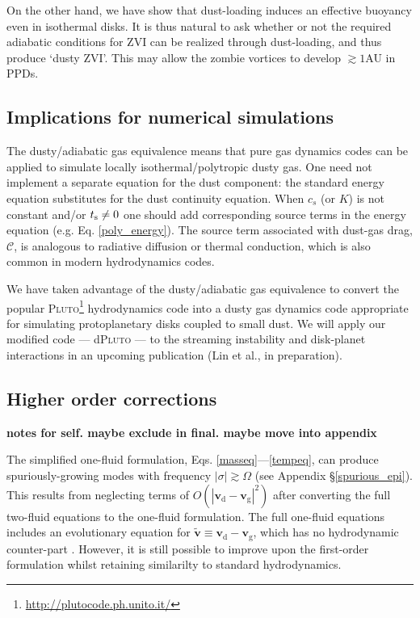 On the other hand, we have show that dust-loading induces an effective
buoyancy even in isothermal disks. It is thus natural to ask whether or not
the required adiabatic conditions for ZVI can be realized through
dust-loading, and thus produce `dusty ZVI'. This may allow the zombie
vortices to develop $\gtrsim 1$AU in PPDs. 

\subsection{Implications for numerical simulations}
The dusty/adiabatic gas equivalence means that pure
gas dynamics codes can be applied to simulate locally
isothermal/polytropic dusty gas. One need not implement a separate 
equation for the dust component: 
 the standard energy equation substitutes for the dust continuity
equation. When $c_s$ (or $K$) is not constant and/or $t_\mathrm{s}\neq0$ one
should add corresponding source terms in the energy equation
(e.g. Eq. \ref{poly_energy}). 
The source term associated with dust-gas drag, $\mathcal{C}$, is 
analogous to radiative diffusion \citep{price15} or thermal
conduction, which is also common in modern hydrodynamics codes.       

We have taken advantage of the dusty/adiabatic gas equivalence to 
convert the popular
\textsc{Pluto}\footnote{\url{http://plutocode.ph.unito.it/}}      
hydrodynamics code \citep{mignone07} into a dusty gas dynamics code appropriate for
simulating protoplanetary disks coupled to small dust. We will apply 
our modified code --- d\textsc{Pluto} --- to the streaming instability
and disk-planet interactions in an upcoming publication (Lin et al.,
in preparation).   

\subsection{Higher order corrections}
{\bf notes for self. maybe exclude in final. maybe move into appendix}

The simplified one-fluid formulation, 
Eqs. \ref{masseq}---\ref{tempeq}, can 
produce spuriously-growing modes with frequency $|\sigma|\gtrsim
\Omega$ (see Appendix \S\ref{spurious_epi}). This 
results from neglecting terms of $O(|\bm{v}_\mathrm{d}-\bm{v}_\mathrm{g}|^2)$ after converting
the full two-fluid equations to the one-fluid formulation. The full
one-fluid equations 
 includes an evolutionary equation for $\widetilde{\bm{v}}\equiv\bm{v}_\mathrm{d}-\bm{v}_\mathrm{g}$, which has no
 hydrodynamic counter-part \citep{laibe14}. However, it is
 still possible to improve upon 
 the first-order formulation whilst retaining similarilty to  
 standard hydrodynamics.  

